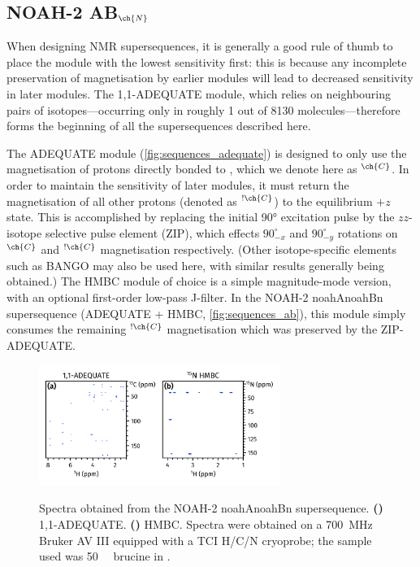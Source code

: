 \documentclass[a4paper,12pt]{article}
\newcommand{\carbon}{\ch{^{13}C}}
\newcommand{\nitrogen}{\ch{^{15}N}}
\newcommand{\magn}[1]{\ch{^1H}$^{#1}$}
\newcommand{\magnnot}[1]{\ch{^1H}$^{!#1}$}
\newcommand*{\brucine}{Spectra were obtained on a \SI{700}{\MHz} Bruker AV III equipped with a TCI H/C/N cryoprobe; the sample used was \SI{50}{\milli\molar} brucine in \ch{CDCl3}.}
\newcommand*{\noahtwo}[2]{\csname noah#1\endcsname\csname noah#2\endcsname}
\begin{document}
\begin{refsection}
\section{NOAH-2 AB\texorpdfstring{$_{\ch{N}}$}{n}}

When designing NMR supersequences, it is generally a good rule of thumb to place the module with the lowest sensitivity first: this is because any incomplete preservation of magnetisation by earlier modules will lead to decreased sensitivity in later modules.
The 1,1-ADEQUATE module, which relies on neighbouring pairs of \carbon{} isotopes---occurring only in roughly 1 out of 8130 molecules---therefore forms the beginning of all the supersequences described here.

The ADEQUATE module (\cref{fig:sequences_adequate}) is designed to only use the magnetisation of protons directly bonded to \carbon{}, which we denote here as \magn{\ch{C}}.\autocite{Orts2018M,Yong2021JMR}
In order to maintain the sensitivity of later modules, it must return the magnetisation of all other protons (denoted as \magnnot{\ch{C}}) to the equilibrium $+z$ state.
This is accomplished by replacing the initial \ang{90} excitation pulse by the $zz$-isotope selective pulse element (ZIP)\autocite{Hansen2021AC,Yong2021JMR}, which effects $90^\circ_{-x}$ and $90^\circ_{-y}$ rotations on \magn{\ch{C}} and \magnnot{\ch{C}} magnetisation respectively.
(Other isotope-specific elements such as BANGO\autocite{Sorensen1994BMR,Nagy2019CC,Nagy2021ACIE} may also be used here, with similar results generally being obtained.\autocite{Yong2021JMR})
The \nitrogen{} HMBC module of choice is a simple magnitude-mode version, with an optional first-order low-pass J-filter.
In the NOAH-2 \noahtwo{A}{Bn} supersequence (ADEQUATE + \nitrogen{} HMBC, \cref{fig:sequences_ab}), this module simply consumes the remaining \magnnot{\ch{C}} magnetisation which was preserved by the ZIP-ADEQUATE.

\begin{figure}[ht]
    \centering
    \includegraphics[width=0.7\textwidth]{ab.png}
    {\label{fig:ab_adeq}}
    {\label{fig:ab_n_hmbc}}
    \caption{
        Spectra obtained from the NOAH-2 \noahtwo{A}{Bn} supersequence.
        \textbf{()} 1,1-ADEQUATE.
        \textbf{()} \nitrogen{} HMBC.
        \brucine{}
    }
    \label{fig:ab}
\end{figure}



\end{refsection}
\end{document}
